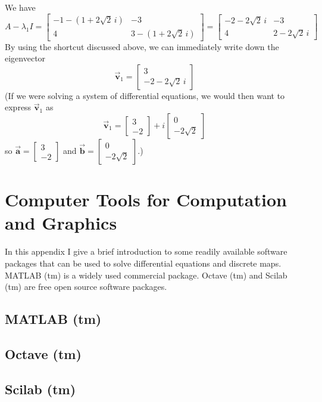 \documentclass{book}
\newcommand{\BA}{\vec{\textbf{a}}}
\newcommand{\BB}{\vec{\textbf{b}}}
\newcommand{\BV}{\vec{\textbf{v}}}
\begin{document}
We have
\[
   A - \lambda_1 I = \begin{bmatrix}
                        -1-(1+2\sqrt{2}\,i) & -3 \\
			4 & 3-(1+2\sqrt{2}\,i)
                     \end{bmatrix}
		   = \begin{bmatrix}
		        -2-2\sqrt{2}\, i & -3 \\
			4 & 2-2\sqrt{2}\,i
		     \end{bmatrix}
\]
By using the shortcut discussed above, we can
immediately write down the eigenvector
\[
  \BV_1 = \begin{bmatrix} 3 \\ -2-2\sqrt{2}\, i \end{bmatrix}
\]
(If we were solving a system of differential equations, we would
then want to express $\BV_1$ as
\[
   \BV_1 = \begin{bmatrix} 3 \\ -2 \end{bmatrix}
           + i \begin{bmatrix} 0 \\ -2\sqrt{2} \end{bmatrix}
\]
so $\BA = \begin{bmatrix} 3 \\ -2\end{bmatrix}$
and $\BB = \begin{bmatrix} 0 \\ -2\sqrt{2} \end{bmatrix}$.)
\chapter[Computer Tools]{Computer Tools for Computation and Graphics}
%
%
In this appendix I give a brief introduction to some
readily available software packages that can be used to solve
differential equations and discrete maps.  MATLAB (tm)
is a widely used commercial package.  Octave (tm) and
Scilab (tm) are free open source software packages. 
\section{MATLAB (tm)}
\section{Octave (tm)}
\section{Scilab (tm)}
\end{document}
